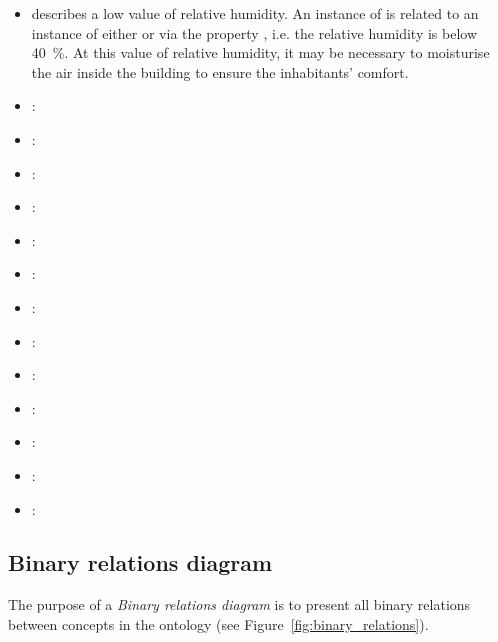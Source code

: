 \begin{itemize}
  \item {} describes a low value of relative humidity. An instance of  is related to an instance of either  or  via the property , i.e. the relative humidity is below \SI{40}{\percent}. At this value of relative humidity, it may be necessary to moisturise the air inside the building to ensure the inhabitants' comfort.
  
  \item {}: %
  
  \item {}: %
  
  \item {}: %
  
  \item {}: %
  
  \item {}: %
  
  \item {}: %
  
  \item {}: %

  \item {}: %
  
  \item {}: %
  
  \item {}: %
  
  \item {}: %
  
  \item {}: %
  
  \item {}: %
\end{itemize}

\subsection{Binary relations diagram}
\label{subsec:binary_relations_diagram}

The purpose of a \emph{Binary relations diagram} is to present all binary relations between concepts in the ontology (see Figure~\ref{fig:binary_relations}).

